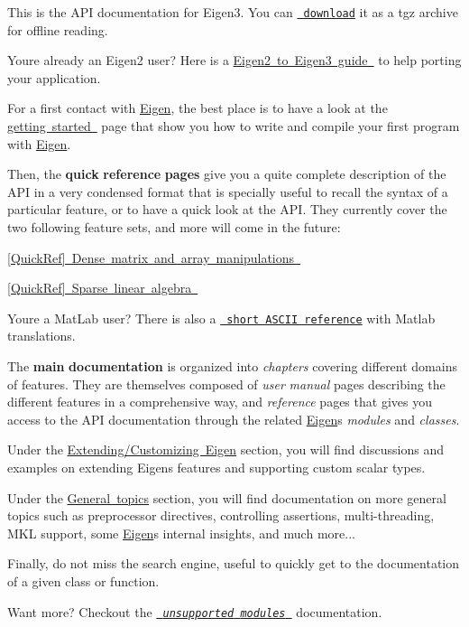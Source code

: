 This is the A\+PI documentation for Eigen3. You can \href{eigen-doc.tgz}{\texttt{ download}} it as a tgz archive for offline reading.

You\textquotesingle{}re already an Eigen2 user? Here is a \mbox{\hyperlink{_eigen2_to_eigen3}{Eigen2 to Eigen3 guide }} to help porting your application.

For a first contact with \mbox{\hyperlink{namespace_eigen}{Eigen}}, the best place is to have a look at the \mbox{\hyperlink{_getting_started}{getting started }} page that show you how to write and compile your first program with \mbox{\hyperlink{namespace_eigen}{Eigen}}.

Then, the {\bfseries{quick}} {\bfseries{reference}} {\bfseries{pages}} give you a quite complete description of the A\+PI in a very condensed format that is specially useful to recall the syntax of a particular feature, or to have a quick look at the A\+PI. They currently cover the two following feature sets, and more will come in the future\+:
\begin{DoxyItemize}
\item \mbox{\hyperlink{group___quick_ref_page}{\mbox{[}Quick\+Ref\mbox{]} Dense matrix and array manipulations }}
\item \mbox{\hyperlink{group___sparse_quick_ref_page}{\mbox{[}Quick\+Ref\mbox{]} Sparse linear algebra }}
\end{DoxyItemize}

You\textquotesingle{}re a Mat\+Lab user? There is also a \href{AsciiQuickReference.txt}{\texttt{ short A\+S\+C\+II reference}} with Matlab translations.

The {\bfseries{main}} {\bfseries{documentation}} is organized into {\itshape chapters} covering different domains of features. They are themselves composed of {\itshape user} {\itshape manual} pages describing the different features in a comprehensive way, and {\itshape reference} pages that gives you access to the A\+PI documentation through the related \mbox{\hyperlink{namespace_eigen}{Eigen}}\textquotesingle{}s {\itshape modules} and {\itshape classes}.

Under the \mbox{\hyperlink{UserManual_CustomizingEigen}{Extending/\+Customizing Eigen}} section, you will find discussions and examples on extending Eigen\textquotesingle{}s features and supporting custom scalar types.

Under the \mbox{\hyperlink{UserManual_Generalities}{General topics}} section, you will find documentation on more general topics such as preprocessor directives, controlling assertions, multi-\/threading, M\+KL support, some \mbox{\hyperlink{namespace_eigen}{Eigen}}\textquotesingle{}s internal insights, and much more...

Finally, do not miss the search engine, useful to quickly get to the documentation of a given class or function.

Want more? Checkout the \href{unsupported/index.html}{\texttt{ {\itshape unsupported} {\itshape modules} }} documentation. 